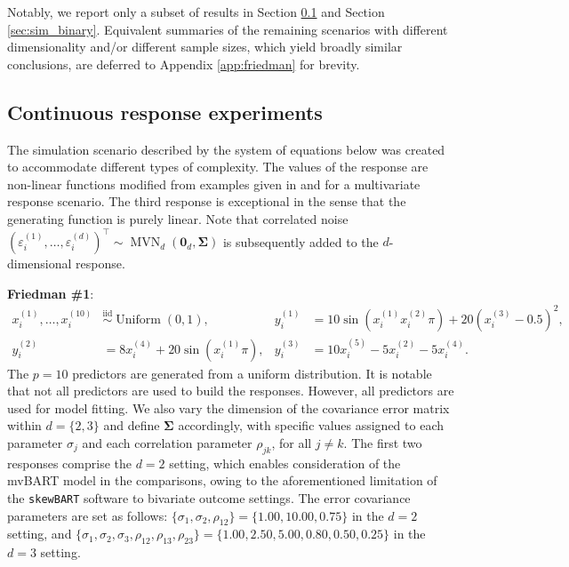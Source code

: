 \documentclass[aoas,preprint]{imsart}
\theoremstyle{plain}
\theoremstyle{definition}
\theoremstyle{remark}
\begin{document}
Notably, we report only a subset of results in Section \ref{sec:sim_continuous} and Section \ref{sec:sim_binary}. Equivalent summaries of the remaining scenarios with different dimensionality and/or different sample sizes, which yield broadly similar conclusions, are deferred to Appendix \ref{app:friedman} for brevity.

\subsection{Continuous response experiments}\label{sec:sim_continuous}

The simulation scenario described by the system of equations below was created to accommodate different types of complexity. The values of the response are non-linear functions modified from examples given in \citet{friedman1991multivariate} and \citet{breiman1996bagging} for a multivariate response scenario. The third response is exceptional in the sense that the generating function is purely linear. Note that correlated noise $(\varepsilon_i^{(1)}, \ldots, \varepsilon_i^{(d)})^\top \sim \operatorname{MVN}_{d}(\mathbf{0}_d, \boldsymbol{\Sigma})$ is subsequently added to the $d$-dimensional response.\smallskip

\noindent\textbf{Friedman \#1}:
\begin{align*}
x^{(1)}_{i}, \ldots, x_{i}^{(10)} &\overset{\mathrm{iid}}{\sim} \operatorname{Uniform}(0, 1), &
y_{i}^{(1)} &= 10 \sin(x_{i}^{(1)} x_{i}^{(2)} \pi) + 20(x_{i}^{(3)} - 0.5)^2, \\
y_{i}^{(2)} &= 8 x_{i}^{(4)} + 20 \sin(x_{i}^{(1)} \pi),&
y_{i}^{(3)} &= 10 x_{i}^{(5)} - 5 x_{i}^{(2)} - 5 x_{i}^{(4)}.
\end{align*}
\indent The $p=10$ predictors are generated from a uniform distribution. 
It is notable that not all predictors are used to build the responses. However, all predictors are used for model fitting. We also vary the dimension of the covariance error matrix within $d = \{2,3\}$ and define $\boldsymbol{\Sigma}$ accordingly, with specific values assigned to each parameter $\sigma_{j}$ and each correlation parameter $\rho_{jk}$, for all $j\neq k$. The first two responses comprise the $d=2$ setting, which enables consideration of the mvBART model in the comparisons, owing to the aforementioned limitation of the \texttt{skewBART} software to bivariate outcome settings. The error covariance parameters are set as follows: $\{ \sigma_{1}, \sigma_{2}, \rho_{12}\}  = \{1.00,10.00,0.75\}$ in the $d=2$ setting, and $\{ \sigma_{1}, \sigma_{2},\sigma_{3},\rho_{12},\rho_{13},\rho_{23}\}  = \{1.00,2.50,5.00,0.80,0.50,0.25\}$ in the $d=3$ setting.
\end{document}
